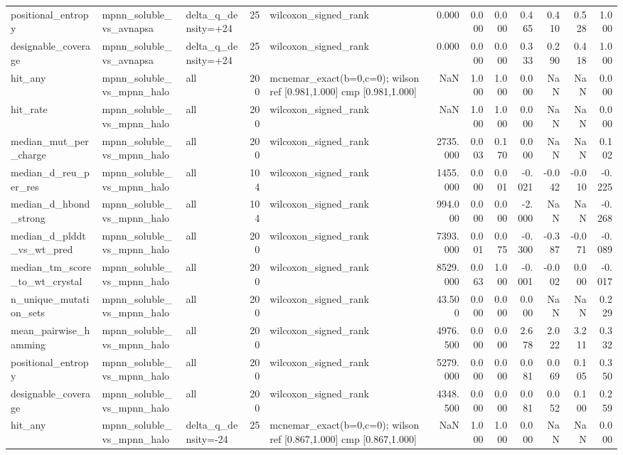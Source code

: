 \begin{table}
{\begin{tabular}{lllrlrrrrrrr}
positional\_entropy & mpnn\_soluble\_vs\_avnapsa & delta\_q\_density=+24 & 25 & wilcoxon\_signed\_rank & 0.000 & 0.000 & 0.000 & 0.465 & 0.410 & 0.528 & 1.000 \\
designable\_coverage & mpnn\_soluble\_vs\_avnapsa & delta\_q\_density=+24 & 25 & wilcoxon\_signed\_rank & 0.000 & 0.000 & 0.000 & 0.333 & 0.290 & 0.418 & 1.000 \\
hit\_any & mpnn\_soluble\_vs\_mpnn\_halo & all & 200 & mcnemar\_exact(b=0,c=0); wilson ref [0.981,1.000] cmp [0.981,1.000] & NaN & 1.000 & 1.000 & 0.000 & NaN & NaN & 0.000 \\
hit\_rate & mpnn\_soluble\_vs\_mpnn\_halo & all & 200 & wilcoxon\_signed\_rank & NaN & 1.000 & 1.000 & 0.000 & NaN & NaN & 0.000 \\
median\_mut\_per\_charge & mpnn\_soluble\_vs\_mpnn\_halo & all & 200 & wilcoxon\_signed\_rank & 2735.000 & 0.003 & 0.170 & 0.000 & NaN & NaN & 0.102 \\
median\_d\_reu\_per\_res & mpnn\_soluble\_vs\_mpnn\_halo & all & 104 & wilcoxon\_signed\_rank & 1455.000 & 0.000 & 0.001 & -0.021 & -0.042 & -0.010 & -0.225 \\
median\_d\_hbond\_strong & mpnn\_soluble\_vs\_mpnn\_halo & all & 104 & wilcoxon\_signed\_rank & 994.000 & 0.000 & 0.000 & -2.000 & NaN & NaN & -0.268 \\
median\_d\_plddt\_vs\_wt\_pred & mpnn\_soluble\_vs\_mpnn\_halo & all & 200 & wilcoxon\_signed\_rank & 7393.000 & 0.001 & 0.075 & -0.300 & -0.387 & -0.071 & -0.089 \\
median\_tm\_score\_to\_wt\_crystal & mpnn\_soluble\_vs\_mpnn\_halo & all & 200 & wilcoxon\_signed\_rank & 8529.000 & 0.063 & 1.000 & -0.001 & -0.002 & 0.000 & -0.017 \\
n\_unique\_mutation\_sets & mpnn\_soluble\_vs\_mpnn\_halo & all & 200 & wilcoxon\_signed\_rank & 43.500 & 0.000 & 0.000 & 0.000 & NaN & NaN & 0.229 \\
mean\_pairwise\_hamming & mpnn\_soluble\_vs\_mpnn\_halo & all & 200 & wilcoxon\_signed\_rank & 4976.500 & 0.000 & 0.000 & 2.678 & 2.022 & 3.211 & 0.332 \\
positional\_entropy & mpnn\_soluble\_vs\_mpnn\_halo & all & 200 & wilcoxon\_signed\_rank & 5279.000 & 0.000 & 0.000 & 0.081 & 0.069 & 0.105 & 0.350 \\
designable\_coverage & mpnn\_soluble\_vs\_mpnn\_halo & all & 200 & wilcoxon\_signed\_rank & 4348.500 & 0.000 & 0.000 & 0.081 & 0.052 & 0.100 & 0.259 \\
hit\_any & mpnn\_soluble\_vs\_mpnn\_halo & delta\_q\_density=-24 & 25 & mcnemar\_exact(b=0,c=0); wilson ref [0.867,1.000] cmp [0.867,1.000] & NaN & 1.000 & 1.000 & 0.000 & NaN & NaN & 0.000 \\

\end{tabular}}
\end{table}

